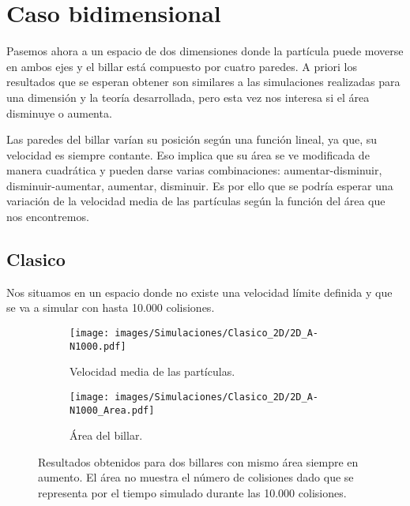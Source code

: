 \documentclass[11pt, spanish]{book}
\begin{document}
\section{Caso bidimensional}

Pasemos ahora a un espacio de dos dimensiones donde la partícula puede moverse en ambos ejes y el billar está compuesto por cuatro paredes. A priori los resultados que se esperan obtener son similares a las simulaciones realizadas para una dimensión y la teoría desarrollada, pero esta vez nos interesa si el área disminuye o aumenta.

\vspace{3mm}

Las paredes del billar varían su posición según una función lineal, ya que, su velocidad es siempre contante. Eso implica que su área se ve modificada de manera cuadrática y pueden darse varias combinaciones: aumentar-disminuir, disminuir-aumentar, aumentar, disminuir. Es por ello que se podría esperar una variación de la velocidad media de las partículas según la función del área que nos encontremos. 

\subsection{Clasico}

Nos situamos en un espacio donde no existe una velocidad límite definida y que se va a simular con hasta 10.000 colisiones.

\begin{figure}[h]
    \begin{subfigure}[b]{0.5\textwidth}
        \centering
        \texttt{[image: images/Simulaciones/Clasico\_2D/2D\_A-N1000.pdf]}
        \caption{Velocidad media de las partículas.}
    \end{subfigure}
    \hfill
    \begin{subfigure}[b]{0.5\textwidth}
        \centering
        \texttt{[image: images/Simulaciones/Clasico\_2D/2D\_A-N1000\_Area.pdf]}
        \caption{Área del billar.}
    \end{subfigure}
    \caption{Resultados obtenidos para dos billares con mismo área siempre en aumento. El área no muestra el número de colisiones dado que se representa por el tiempo simulado durante las 10.000 colisiones.}
    \label{fig:2D_A-N1000_con_Area}
\end{figure}
\end{document}
